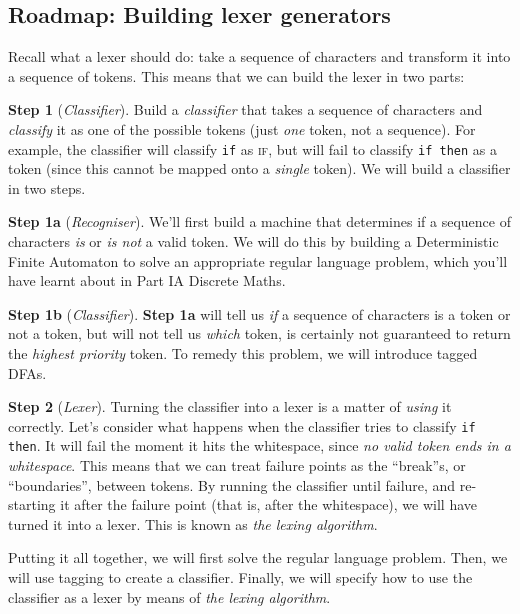 \subsection{Roadmap: Building lexer generators}
Recall what a lexer should do: take a sequence of characters and transform it into a sequence of tokens. This means that we can build the lexer in two parts:

\textbf{Step 1} (\textit{Classifier}). Build a \textit{classifier} that takes a sequence of characters and \emph{classify} it as one of the possible tokens (just \emph{one} token, not a sequence). For example, the classifier will classify \texttt{if} as \textsc{if}, but will fail to classify \texttt{if then} as a token (since this cannot be mapped onto a \emph{single} token). We will build a classifier in two steps.

\begin{addmargin}[1cm]{0cm}
\textbf{Step 1a} (\textit{Recogniser}). We'll first build a machine that determines if a sequence of characters \textit{is} or \textit{is not} a valid token. We will do this by building a Deterministic Finite Automaton to solve an appropriate regular language problem, which you'll have learnt about in {\sffamily Part IA Discrete Maths}.

\textbf{Step 1b} (\textit{Classifier}). \textbf{Step 1a} will tell us \emph{if} a sequence of characters is a token or not a token, but will not tell us \emph{which} token, is certainly not guaranteed to return the \emph{highest priority} token. To remedy this problem, we will introduce tagged DFAs. 
\end{addmargin}

\textbf{Step 2} (\textit{Lexer}). Turning the classifier into a lexer is a matter of \textit{using} it correctly. Let's consider what happens when the classifier tries to classify \texttt{if then}. It will fail the moment it hits the whitespace, since \emph{no valid token ends in a whitespace}. This means that we can treat failure points as the ``break''s, or ``boundaries'', between tokens. By running the classifier until failure, and re-starting it after the failure point (that is, after the whitespace), we will have turned it into a lexer. This is known as \emph{the lexing algorithm}. 


Putting it all together, we will first solve the regular language problem. Then, we will use tagging to create a classifier. Finally, we will specify how to use the classifier as a lexer by means of \emph{the lexing algorithm}.

